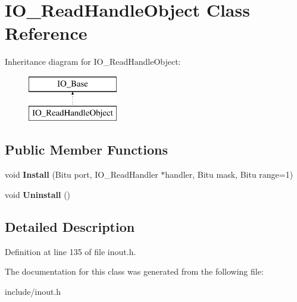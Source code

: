 \hypertarget{classIO__ReadHandleObject}{\section{I\-O\-\_\-\-Read\-Handle\-Object Class Reference}
\label{classIO__ReadHandleObject}
}
Inheritance diagram for I\-O\-\_\-\-Read\-Handle\-Object\-:\begin{figure}[H]
\begin{center}
\leavevmode
\includegraphics[height=2.000000cm]{classIO__ReadHandleObject}
\end{center}
\end{figure}
\subsection*{Public Member Functions}
\begin{DoxyCompactItemize}
\item 
\hypertarget{classIO__ReadHandleObject_ad4e71cb8937ca40c6371653d24333e32}{void {\bfseries Install} (Bitu port, I\-O\-\_\-\-Read\-Handler $\ast$handler, Bitu mask, Bitu range=1)}\label{classIO__ReadHandleObject_ad4e71cb8937ca40c6371653d24333e32}

\item 
\hypertarget{classIO__ReadHandleObject_ad7e8dfdd84ef0e41dcbd1b29d6c02df0}{void {\bfseries Uninstall} ()}\label{classIO__ReadHandleObject_ad7e8dfdd84ef0e41dcbd1b29d6c02df0}

\end{DoxyCompactItemize}


\subsection{Detailed Description}


Definition at line 135 of file inout.\-h.



The documentation for this class was generated from the following file\-:\begin{DoxyCompactItemize}
\item 
include/inout.\-h\end{DoxyCompactItemize}
